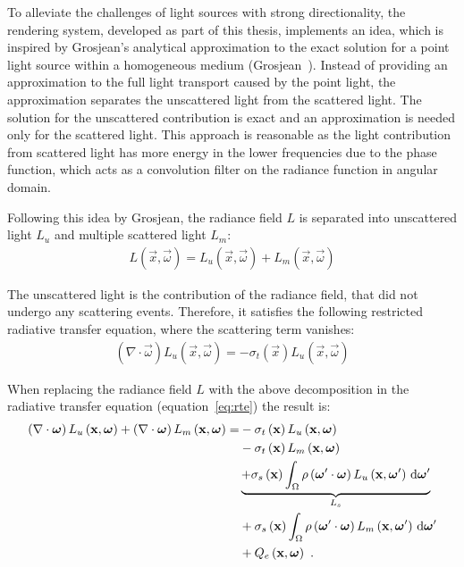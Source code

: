 To alleviate the challenges of light sources with strong directionality, the rendering system, developed as part of this thesis, implements an idea, which is inspired by Grosjean’s analytical approximation to the exact solution for a point light source within a homogeneous medium (Grosjean~\cite{Grosjean56}). Instead of providing an approximation to the full light transport caused by the point light, the approximation separates the unscattered light from the scattered light. The solution for the unscattered contribution is exact and an approximation is needed only for the scattered light. This approach is reasonable as the light contribution from scattered light has more energy in the lower frequencies due to the phase function, which acts as a convolution filter on the radiance function in angular domain.

Following this idea by Grosjean, the radiance field $L$ is separated into unscattered light $L_{u}$ and multiple scattered light $L_m$:
\begin{align}
L\left(\vec{x}, \vec{\omega}\right) = 
L_u\left(\vec{x}, \vec{\omega}\right)
+L_m\left(\vec{x}, \vec{\omega}\right)
\end{align}

The unscattered light is the contribution of the radiance field, that did not undergo any scattering events. Therefore, it satisfies the following restricted radiative transfer equation, where the scattering term vanishes:
\begin{align}
\left(\nabla\cdot\vec{\omega}\right)L_u\left(\vec{x}, \vec{\omega} \right)
=
-\sigma_t\left(\vec{x}\right) L_u\left(\vec{x}, \vec{\omega} \right)
\label{eq:restricted_rte}
\end{align}


When replacing the radiance field $L$ with the above decomposition in the radiative transfer equation (equation~\ref{eq:rte}) the result is:
\begin{align}
\left(\nabla\cdot\boldsymbol{\mathbf{\omega}}\right)L_u\left(\boldsymbol{\mathbf{x}}, \boldsymbol{\mathbf{\omega}} \right)
+\left(\nabla\cdot\boldsymbol{\mathbf{\omega}}\right)L_m\left(\boldsymbol{\mathbf{x}}, \boldsymbol{\mathbf{\omega}} \right)
=&
-\sigma_t\left(\boldsymbol{\mathbf{x}}\right) L_u\left(\boldsymbol{\mathbf{x}}, \boldsymbol{\mathbf{\omega}} \right)
\nonumber\\
&
-\sigma_t\left(\boldsymbol{\mathbf{x}}\right) L_m\left(\boldsymbol{\mathbf{x}}, \boldsymbol{\mathbf{\omega}} \right)\nonumber\\
&
\underbrace
{
+\sigma_s\left(\boldsymbol{\mathbf{x}}\right) \int_{\Omega}
{
\rho\left(\boldsymbol{\mathbf{\omega}}'\cdot\boldsymbol{\mathbf{\omega}}\right)L_u\left(\boldsymbol{\mathbf{x}}, \boldsymbol{\mathbf{\omega}}' \right)\,\mathrm{d}\boldsymbol{\mathbf{\omega}}'
}
}_{L_s}
\nonumber\\
&
+\sigma_s\left(\boldsymbol{\mathbf{x}}\right) \int_{\Omega}
{
\rho\left(\boldsymbol{\mathbf{\omega}}'\cdot\boldsymbol{\mathbf{\omega}}\right)L_m\left(\boldsymbol{\mathbf{x}}, \boldsymbol{\mathbf{\omega}}' \right)\,\mathrm{d}\boldsymbol{\mathbf{\omega}}'
}
\nonumber
\\
&
+Q_e\left(\boldsymbol{\mathbf{x}}, \boldsymbol{\mathbf{\omega}}\right)
\nonumber
\  .
\end{align}

